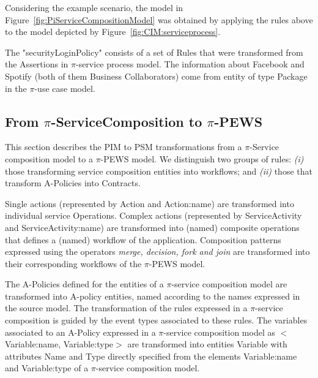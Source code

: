 \begin{example}\label{ex:toPublicMusicT5}
Considering the example scenario, the model in Figure~\ref{fig:PiServiceCompositionModel} was obtained by applying the rules above to the model depicted by Figure~\ref{fig:CIM:serviceprocess}.  

The "securityLoginPolicy" consists of a set of {\sf Rules} that were transformed from the {\sf Assertions} in $\pi$-service process model. 
The information about Facebook and Spotify (both of them {\sf Business
Collaborators}) come from entity of type {\sc Package} in the $\pi$-use case
model.
\end{example}

\subsection{From $\pi$-ServiceComposition to $\pi$-PEWS}

This section describes the PIM to PSM transformations from a $\pi$-Service composition model to a $\pi$-PEWS model. 
We distinguish two groups of rules: \textit{(i)} those transforming service composition entities into workflows; and \textit{(ii)} those that transform  A-Policies into Contracts.

Single actions (represented by {\sf Action} and {\sf
Action:name}) are transformed into individual service {\sf Operations}.
Complex actions (represented by {\sf ServiceActivity}  and  {\sf
ServiceActivity:name}) are transformed into (named) composite
operations that defines a (named) workflow of the application.
Composition patterns expressed using the operators {\sc\em merge, decision, fork and join} are transformed into their corresponding workflows of the $\pi$-PEWS model.


The A-Policies defined for the entities of a $\pi$-service composition model are transformed into {\sf A-policy} entities, named according to the names expressed in the source model.
The transformation of the rules expressed in a $\pi$-service composition is guided by the event types associated to these rules. 
The variables associated to an A-Policy expressed in a $\pi$-service composition model as {\sf $<$Variable:name, Variable:type$>$} are transformed into entities  {\sf Variable} with attributes {\sf Name} and {\sf Type} directly specified from the elements {\sf Variable:name} and {\sf Variable:type} of a $\pi$-service composition model.

